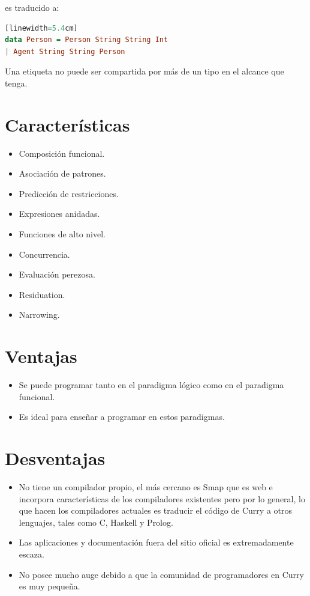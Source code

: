 \documentclass[10pt,journal,compsoc]{IEEEtran}
\begin{document}
es traducido a: 

\begin{lstlisting}[language=Haskell, caption = {Definici\'on usando etiquetas de campos }][linewidth=5.4cm]
data Person = Person String String Int
| Agent String String Person
\end{lstlisting}

Una etiqueta no puede ser compartida por m\'as de un tipo en el alcance que tenga. 

\section{Caracter\'isticas}
\begin{itemize}
	\item Composici\'on funcional.
	\item Asociaci\'on de patrones.
	\item Predicci\'on de restricciones.
	\item Expresiones anidadas.
	\item Funciones de alto nivel.
	\item Concurrencia.
	\item Evaluaci\'on perezosa.
	\item Residuation.
	\item Narrowing.
\end{itemize}

\section{Ventajas}
\begin{itemize}
	\item Se puede programar tanto en el paradigma l\'ogico como en el paradigma funcional.
	\item Es ideal para ense\~nar a programar en estos paradigmas.
\end{itemize}

\section{Desventajas}
\begin{itemize}
	\item No tiene un compilador propio, el m\'as cercano es Smap que es web e incorpora caracter\'isticas de los compiladores existentes pero por lo general, lo que hacen los compiladores actuales es traducir el c\'odigo de Curry a otros lenguajes, tales como C, Haskell y Prolog.
	\item Las aplicaciones y documentaci\'on fuera del sitio oficial es extremadamente escaza.
	\item No posee mucho auge debido a que la comunidad de programadores en Curry es muy peque\~na.
\end{itemize}
\end{document}

